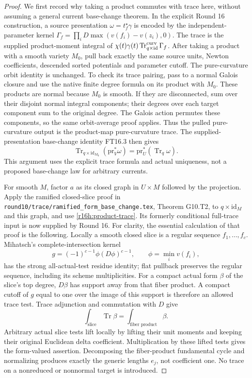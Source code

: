 \begin{proof}
We first record why taking a product commutes with trace here, without
assuming a general current base-change theorem. In the explicit Round 16
construction, a source presentation $\omega=t_f^\star\gamma$ is encoded by
the independent-parameter kernel
$\Gamma_f=\prod_iD\max(v(f_i)-v(z_i),0)$. The trace is the supplied
product-moment integral of
$\chi(t)\gamma(t)\operatorname{Tr}^{\rm curv}_{q\times\mathrm{id}}\Gamma_f$.
After taking a product with a smooth variety $M_0$, pull back exactly the
same source units, Newton coefficients, descended sorted potentials and
parameter cutoff. The pure-curvature orbit identity is unchanged.
To check its trace pairing, pass to a normal Galois closure and use the
native finite degree formula on its product with $M_0$. These products
are normal because $M_0$ is smooth. If they are disconnected, sum over
their disjoint normal integral components; their degrees over each
target component sum to the original degree. The Galois action permutes
these components, so the same orbit-average proof applies. Thus the
pulled pure-curvature output is the product-map pure-curvature trace.
The supplied-presentation base-change identity FT16.3 then gives
\[
 \operatorname{Tr}_{q\times\mathrm{id}_{M_0}}(\mathrm{pr}_V^*\omega)
             =\mathrm{pr}_U^*(\operatorname{Tr}_q\omega).
 \tag{H16.2}\label{r16h:product-trace}
\]
This argument uses the explicit trace formula and actual uniqueness,
not a proposed base-change law for arbitrary currents.

For smooth $M$, factor $a$ as its closed graph in $U\times M$ followed
by the projection. Apply the ramified closed-slice proof in
\texttt{round10/trace/ramified\_form\_base\_change.tex},
Theorem G10.T2, to $q\times\mathrm{id}_M$ and this graph, and use
\eqref{r16h:product-trace}. Its formerly conditional full-trace input is
now supplied by Round 16. For clarity, the essential calculation of that
proof is the following. Locally a smooth closed slice is a regular
sequence $f_1,\ldots,f_c$. Mihatsch's complete-intersection kernel
\[
 g=(-1)^{c-1}\phi(D\phi)^{c-1},\qquad \phi=\min_i v(f_i),
\]
has the strong all-actual-test residue identity; flat pullback preserves
the regular sequence, including its scheme multiplicities. For a compact
actual form $\beta$ of the slice's top degree, $D\beta$ has support away
from that fiber product. A compact cutoff of $g$ equal to one over the
image of this support is therefore an allowed trace test. Trace
adjunction and commutation with $D$ give
\[
 \int_{\text{slice}}\operatorname{Tr}\beta
                   =\int_{\text{fiber product}}\beta.
\]
Arbitrary actual slice tests lift locally by lifting their unit moments
and keeping their original Euclidean delta coefficient. Multiplication
by these lifted tests gives the form-valued assertion. Decomposing the
fiber-product fundamental cycle and normalizing produces exactly the
generic lengths $e_j$, not coefficient one. No trace on a nonreduced
or nonnormal target is introduced.


\end{proof}
